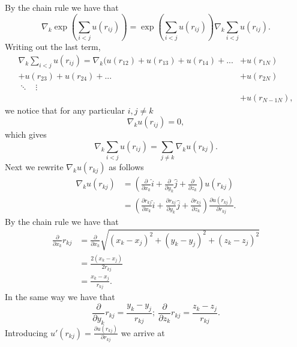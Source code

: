 \documentclass[a4paper,10pt]{article}
\begin{document}
\begin{appendices}
By the chain rule we have that
\begin{equation}
 \nabla_k\exp \left( \sum _{i<j}u(r_{ij})\right) = \exp \left( \sum _{i<j}u(r_{ij})\right)\nabla_k\sum _{i<j}u(r_{ij}).
\end{equation}
Writing out the last term,
\begin{align*}
 \nabla_k\sum _{i<j}u(r_{ij}) = \nabla_k(u(r_{12}) + u(r_{13}) + u(r_{14}) + ... &+ u(r_{1N})   \\
					        + u(r_{23}) + u(r_{24}) + ... &+ u(r_{2N})      \\	
					               \ddots  \ \ \ \       \vdots \ \ &       \\
					                       &+ u(r_{N-1 N}),
\end{align*}
we notice that for any particular $i,j\neq k$
\begin{equation}
 \nabla_k u(r_{ij}) = 0,
\end{equation}
which gives 
\begin{equation}
 \nabla_k \sum _{i<j}u(r_{ij}) = \sum _{j \neq k} \nabla_k u(r_{kj}).
\end{equation}
Next we rewrite $\nabla_k u(r_{kj})$ as follows
\begin{align*}
 \nabla_k u(r_{kj}) &= \left( \frac{\partial}{\partial x_k}\hat{i} + \frac{\partial}{\partial y_k}\hat{j} + \frac{\partial}{\partial z_k}\right)u(r_{kj})  \\
                    &= \left( \frac{\partial r_{kj}}{\partial x_k}\hat{i} + \frac{\partial r_{kj}}{\partial y_k}\hat{j} + 
                    \frac{\partial r_{kj}}{\partial z_k}\right)\frac{\partial u(r_{kj})}{\partial r_{kj}}.
\end{align*}
By the chain rule we have that
\begin{align*}
 \frac{\partial }{\partial x_k}r_{kj} &= \frac{\partial}{\partial x_k}\sqrt{(x_k - x_j)^2 + (y_k - y_j)^2 + (z_k- z_j)^2}     \\
				      &= \frac{2(x_k - x_j)}{2r_{kj}}                                                         \\
				      &= \frac{x_k - x_j}{r_{kj}}.
\end{align*}
In the same way we have that
\begin{equation}
\frac{\partial }{\partial y_k}r_{kj} = \frac{y_k - y_j}{r_{kj}};\ \frac{\partial }{\partial z_k}r_{kj} = \frac{z_k - z_j}{r_{kj}}.
\end{equation}
Introducing $u'(r_{kj}) = \frac{\partial u(r_{kj})}{\partial r_{kj}}$ we arrive at 
\begin{align}

\end{align}
\end{appendices}
\end{document}
